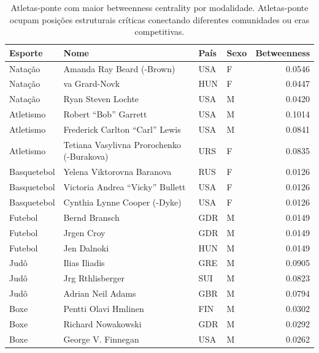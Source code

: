 \begin{table}[htbp]
\centering
\caption{Atletas-ponte com maior betweenness centrality por modalidade. Atletas-ponte ocupam posições estruturais críticas conectando diferentes comunidades ou eras competitivas.}
\label{tab:bridge_athletes}
\footnotesize
\begin{tabular}{@{}llllr@{}}
\toprule
\textbf{Esporte} & \textbf{Nome} & \textbf{País} & \textbf{Sexo} & \textbf{Betweenness} \\
\midrule
Natação & Amanda Ray Beard (-Brown) & USA & F & 0.0546 \\
Natação & va Grard-Novk & HUN & F & 0.0447 \\
Natação & Ryan Steven Lochte & USA & M & 0.0420 \\
Atletismo & Robert ``Bob'' Garrett & USA & M & 0.1014 \\
Atletismo & Frederick Carlton ``Carl'' Lewis & USA & M & 0.0841 \\
Atletismo & Tetiana Vasylivna Prorochenko (-Burakova) & URS & F & 0.0835 \\
Basquetebol & Yelena Viktorovna Baranova & RUS & F & 0.0126 \\
Basquetebol & Victoria Andrea ``Vicky'' Bullett & USA & F & 0.0126 \\
Basquetebol & Cynthia Lynne Cooper (-Dyke) & USA & F & 0.0126 \\
Futebol & Bernd Bransch & GDR & M & 0.0149 \\
Futebol & Jrgen Croy & GDR & M & 0.0149 \\
Futebol & Jen Dalnoki & HUN & M & 0.0149 \\
Judô & Ilias Iliadis & GRE & M & 0.0905 \\
Judô & Jrg Rthlisberger & SUI & M & 0.0823 \\
Judô & Adrian Neil Adams & GBR & M & 0.0794 \\
Boxe & Pentti Olavi Hmlinen & FIN & M & 0.0302 \\
Boxe & Richard Nowakowski & GDR & M & 0.0292 \\
Boxe & George V. Finnegan & USA & M & 0.0262 \\
\bottomrule
\end{tabular}
\end{table}
